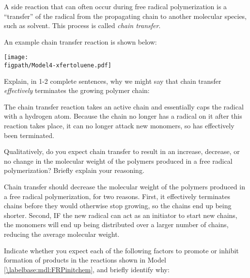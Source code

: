 \begin{activity}
\begin{model}
	A side reaction that can often occur during free radical polymerization is a ``transfer'' of the radical from the propagating chain to another molecular species, such as solvent.  This process is called \emph{chain transfer}.
	
	An example chain transfer reaction is shown below:
	
			\centerline{\texttt{[image: \\figpath/Model4-xfertoluene.pdf]}}
	
\end{model}

\begin{ctqs}
	\question Explain, in 1-2 complete sentences, why we might say that chain transfer \emph{effectively} terminates the growing polymer chain:
	
		\begin{solution}[1.75in]
			The chain transfer reaction takes an active chain and essentially caps the radical with a hydrogen atom.  Because the chain no longer has a radical on it after this reaction takes place, it can no longer attack new monomers, so has effectively been terminated.
		\end{solution}
	
	\question Qualitatively, do you expect chain transfer to result in an increase, decrease, or no change in the molecular weight of the polymers produced in a free radical polymerization?  Briefly explain your reasoning.
	
		\begin{solution}[1.75in]
			Chain transfer should decrease the molecular weight of the polymers produced in a free radical polymerization, for two reasons.  First, it effectively terminates chains before they would otherwise stop growing, so the chains end up being shorter.  Second, IF the new radical can act as an initiator to start new chains, the monomers will end up being distributed over a larger number of chains, reducing the average molecular weight.
		\end{solution}
		
\end{ctqs}


\begin{exercises}

	\exercise Indicate whether you expect each of the following factors to promote or inhibit formation of products in the reactions shown in Model \ref{\labelbase:mdl:FRPinitchem}, and briefly identify why: %
	

\end{exercises}
\end{activity}
